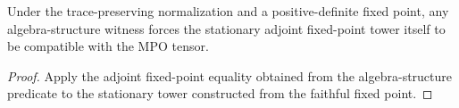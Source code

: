 \begin{theorem}%
    \label{thm:mpdo_stationary_tower_from_algebra}
    \leanok
    Under the trace-preserving normalization and a positive-definite fixed
    point, any algebra-structure witness forces the stationary adjoint
    fixed-point tower itself to be compatible with the MPO tensor.
\end{theorem}
\begin{proof}\leanok
    Apply the adjoint fixed-point equality obtained from the algebra-structure
    predicate to the stationary tower constructed from the faithful fixed point.
\end{proof}

